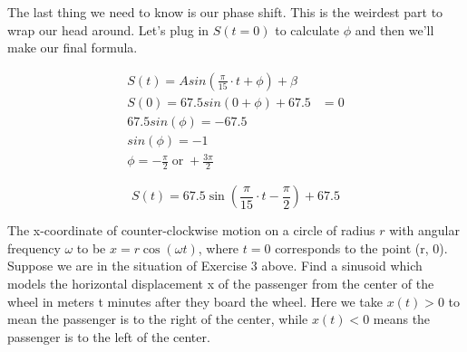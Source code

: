 \documentclass[10pt,letterpaper]{amspset}
\begin{document}
\begin{solution}
    The last thing we need to know is our phase shift. This is the weirdest part to wrap our head around. Let's plug in $S(t = 0)$ to calculate $\phi$ and then we'll make our final formula.
    
    \begin{align}
        S(t) = A sin (\frac{\pi}{15} \cdot t + \phi) + \beta \\
        S(0) = 67.5 sin (0 + \phi) + 67.5 &= 0 \\
        67.5 sin(\phi) = -67.5 \\
        sin(\phi) = -1 \\
        \phi = -\frac{\pi}{2} \; \text{or} \; + \frac{3\pi}{2}
    \end{align}
    
    \[\boxed{ S(t) = 67.5 \sin \left( \frac{\pi}{15} \cdot t - \frac{\pi}{2} \right) + 67.5  }\]
\end{solution}

\pagebreak


\begin{problem}[4]
    The x-coordinate of counter-clockwise motion on a circle of radius $r$ with angular frequency $\omega$ to be $x = r \cos(\omega t)$, where $t = 0$ corresponds to the point (r, 0). Suppose we are in the situation of Exercise 3 above. Find a sinusoid which models the horizontal displacement x of the passenger from the center of the wheel in meters t minutes after they board the wheel. Here we take $x(t) > 0$ to mean the passenger is to the right of the center, while $x(t) < 0$ means the passenger is to the left of the center.
\end{problem}
\end{document}
